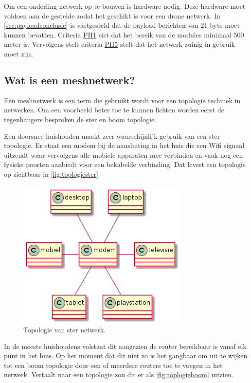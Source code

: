 \documentclass[a4paper, 11pt, oneside]{report}
\begin{document}
Om een onderling netwerk op te bouwen is hardware nodig. 
Deze hardware moet voldoen aan de gestelde  zodat het geschikt is voor een drone netwerk.
In \autoref{sec:payloadconclusie} is vastgesteld dat de payload berichten van 21 byte moet kunnen bevatten.
Criteria \hyperlink{ph1}{PH1} eist dat het bereik van de modules minimaal 500 meter is.
Vervolgens stelt criteria \hyperlink{ph5}{PH5} stelt dat het netwerk zuinig in gebruik moet zijn. 

\subsection{Wat is een meshnetwerk?}
\label{sec:meshnetwerkkeuze:watismesh}
Een meshnetwerk is een term die gebruikt wordt voor een topologie techniek in netwerken.
Om een voorbeeld beter toe te kunnen lichten worden eerst de tegenhangers besproken de ster en boom topologie.

Een doorsnee huishouden maakt zeer waarschijnlijk gebruik van een ster topologie.
Er staat een modem bij de aansluiting in het huis die een Wifi signaal uitzendt waar vervolgens alle mobiele apparaten mee verbinden en vaak nog een fysieke poorten aanbiedt voor een bekabelde verbinding.
Dat levert een topologie op zichtbaar in \autoref{fig:toplogiester}

\begin{figure}[H]
	\begin{center}\includegraphics[width=.4\linewidth]{sterTopo}\end{center}
	\caption{Topologie van ster netwerk.}
	\label{fig:toplogiester}
\end{figure}

In de meeste huishoudens volstaat dit aangezien de router bereikbaar is vanaf elk punt in het huis.
Op het moment dat dit niet zo is het gangbaar om uit te wijken tot een boom topologie door een of meerdere routers toe te voegen in het netwerk.
Vertaalt naar een topologie zou dit er als \autoref{fig:toplogieboom} uitzien.
\end{document}
